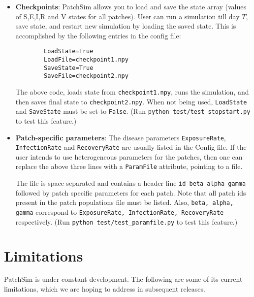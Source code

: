\documentclass[10pt]{scrartcl}
\theoremstyle{definition}
\begin{document}
\begin{itemize}
	\item \textbf{Checkpoints}: PatchSim allows you to load and save the state 
	array (values of S,E,I,R and V states for all patches). User can run a 
	simulation till day $T$, save state, and restart new simulation by loading 
	the saved state. This is accomplished by the following entries in the 
	config file:
	
	\begin{center}
		\begin{lstlisting}
		LoadState=True
		LoadFile=checkpoint1.npy
		SaveState=True
		SaveFile=checkpoint2.npy
		\end{lstlisting}
	\end{center}
	
	The above code, loads state from \verb|checkpoint1.npy|, runs the 
	simulation, and then saves final state to \verb|checkpoint2.npy|. When not 
	being used, \verb|LoadState| and \verb|SaveState| must be set to 
	\verb|False|.
	(Run \verb|python test/test_stopstart.py| to test this feature.)
	
	\item \textbf{Patch-specific parameters}: The disease parameters 
	\verb|ExposureRate|, \verb|InfectionRate| and \verb|RecoveryRate| are 
	usually listed in the Config file. If the user intends to use heterogeneous 
	parameters for the patches, then one can replace the above three lines with 
	a \verb|ParamFile| attribute, pointing to a file.
	
	The file is space separated and contains a header line 
	\verb|id beta alpha gamma| followed by patch specific parameters for each 
	patch. Note that all patch ids present in the patch populations file must 
	be listed. Also, \verb|beta, alpha, gamma| correspond to 
	\verb|ExposureRate, InfectionRate, RecoveryRate| respectively.
	(Run \verb|python test/test_paramfile.py| to test this feature.)
	
\end{itemize}


\section{Limitations}
PatchSim is under constant development. The following are some of its current 
limitations, which we are hoping to address in subsequent releases.
\end{document}
